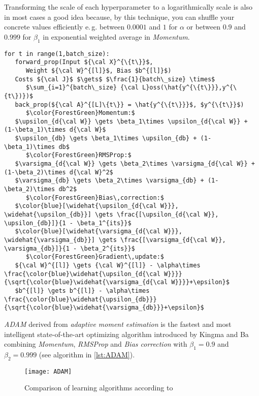 \documentclass[dvipsnames,twocolumn]{scrartcl}
\begin{document}
	Transforming the scale of each hyperparameter to a logarithmically scale is also in most cases a good idea because, by this technique, you can shuffle your concrete values efficiently e.\,g. between $0.0001$ and $1$ for $\alpha$ or between $0.9$ and $0.999$ for $\beta_1$ in exponential weighted average in \emph{Momentum}.
	
	\begin{lstlisting}[frame=single,caption={\texttt{Stochastic Gradient Descent with ADAM} Algorithm},label={lst:ADAM}]
for t in range(1,batch_size):
   forward_prop(Input ${\cal X}^{\{t\}}$,
      Weight ${\cal W}^{[l]}$, Bias $b^{[l]}$)
   Costs ${\cal J}$ $\gets$ $\frac{1}{batch\_size} \times$
      $\sum_{i=1}^{batch\_size} {\cal L}oss(\hat{y^{\{t\}}},y^{\{t\})})$
   back_prop(${\cal A}^{[L]\{t\}} = \hat{y^{\{t\}}}$, $y^{\{t\}}$)
      $\color{ForestGreen}Momentum:$
   $\upsilon_{d{\cal W}} \gets \beta_1\times \upsilon_{d{\cal W}} + (1-\beta_1)\times d{\cal W}$
   $\upsilon_{db} \gets \beta_1\times \upsilon_{db} + (1-\beta_1)\times db$
      $\color{ForestGreen}RMSProp:$
   $\varsigma_{d{\cal W}} \gets \beta_2\times \varsigma_{d{\cal W}} + (1-\beta_2)\times d{\cal W}^2$
   $\varsigma_{db} \gets \beta_2\times \varsigma_{db} + (1-\beta_2)\times db^2$
      $\color{ForestGreen}Bias\,correction:$
   $\color{blue}[\widehat{\upsilon_{d{\cal W}}}, \widehat{\upsilon_{db}}] \gets \frac{[\upsilon_{d{\cal W}}, \upsilon_{db}]}{1 - \beta_1^{its}}$
   $\color{blue}[\widehat{\varsigma_{d{\cal W}}}, \widehat{\varsigma_{db}}] \gets \frac{[\varsigma_{d{\cal W}}, \varsigma_{db}]}{1 - \beta_2^{its}}$
      $\color{ForestGreen}Gradient\,update:$
   ${\cal W}^{[l]} \gets {\cal W}^{[l]} - \alpha\times \frac{\color{blue}\widehat{\upsilon_{d{\cal W}}}}{\sqrt{\color{blue}\widehat{\varsigma_{d{\cal W}}}}+\epsilon}$
   $b^{[l]} \gets b^{[l]} - \alpha\times \frac{\color{blue}\widehat{\upsilon_{db}}}{\sqrt{\color{blue}\widehat{\varsigma_{db}}}+\epsilon}$
	\end{lstlisting}
	
	\emph{ADAM} derived from \emph{adaptive moment estimation} is the fastest and most intelligent state-of-the-art optimizing algorithm introduced by Kingma and Ba~\cite{adam} combining \emph{Momentum}, \emph{RMSProp} and \emph{Bias correction} with $\beta_1 = 0.9$ and $\beta_2 = 0.999$ (see algorithm in \autoref{lst:ADAM}).
	
	\begin{figure}
		\caption{Comparison of learning algorithms according to~\cite{adam}}
		\texttt{[image: ADAM]}%
	\end{figure}
	
\end{document}
